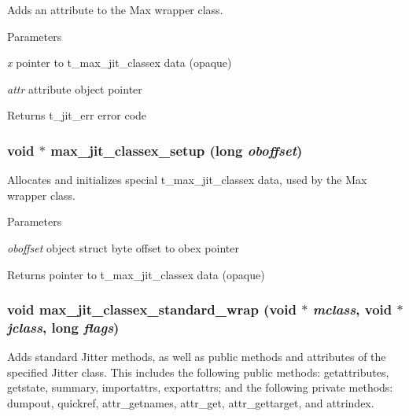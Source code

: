 Adds an attribute to the Max wrapper class. 
\begin{DoxyParams}{Parameters}
\item[{\em x}]pointer to t\_\-max\_\-jit\_\-classex data (opaque) \item[{\em attr}]attribute object pointer\end{DoxyParams}
\begin{DoxyReturn}{Returns}
t\_\-jit\_\-err error code 
\end{DoxyReturn}
\hypertarget{group__maxwrapmod_ga773b6e6430d9de2e295419c7f038979e}{
\subsubsection[{max\_\-jit\_\-classex\_\-setup}]{\setlength{\rightskip}{0pt plus 5cm}void $\ast$ max\_\-jit\_\-classex\_\-setup (long {\em oboffset})}}
\label{group__maxwrapmod_ga773b6e6430d9de2e295419c7f038979e}


Allocates and initializes special t\_\-max\_\-jit\_\-classex data, used by the Max wrapper class. 
\begin{DoxyParams}{Parameters}
\item[{\em oboffset}]object struct byte offset to obex pointer\end{DoxyParams}
\begin{DoxyReturn}{Returns}
pointer to t\_\-max\_\-jit\_\-classex data (opaque) 
\end{DoxyReturn}
\hypertarget{group__maxwrapmod_ga9b8377bdccc2497e02582c72204b5250}{
\subsubsection[{max\_\-jit\_\-classex\_\-standard\_\-wrap}]{\setlength{\rightskip}{0pt plus 5cm}void max\_\-jit\_\-classex\_\-standard\_\-wrap (void $\ast$ {\em mclass}, \/  void $\ast$ {\em jclass}, \/  long {\em flags})}}
\label{group__maxwrapmod_ga9b8377bdccc2497e02582c72204b5250}


Adds standard Jitter methods, as well as public methods and attributes of the specified Jitter class. This includes the following public methods: getattributes, getstate, summary, importattrs, exportattrs; and the following private methods: dumpout, quickref, attr\_\-getnames, attr\_\-get, attr\_\-gettarget, and attrindex.


